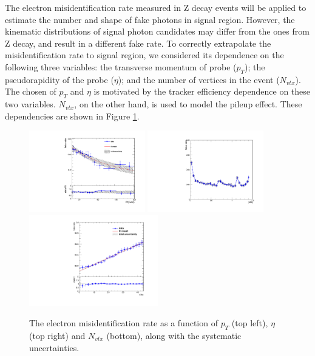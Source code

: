 \documentclass[thesis.tex]{subfiles}
\renewcommand\_{\textunderscore\allowbreak}
\begin{document}
The electron misidentification rate measured in Z decay events will be applied to estimate the number and shape of fake photons in signal region. However, the kinematic distributions of signal photon candidates may differ from the ones from Z decay, and result in a different fake rate. To correctly extrapolate the misidentification rate to signal region, we considered its dependence on the following three variables: the transverse momentum of probe ($p_T$); the pseudorapidity of the probe ($\eta$); and the number of vertices in the event ($N_{vtx}$). The chosen of $p_T$ and $\eta$ is motivated by the tracker efficiency dependence on these two variables. $N_{vtx}$, on the other hand, is used to model the pileup effect. These dependencies are shown in Figure \ref{fig:elefakepho_rate_pt}.


\begin{figure}[hbtp]
  \centering
    \includegraphics[width=0.45\textwidth]{Figures/elefake_pt_systematic_data.pdf}
    \includegraphics[width=0.45\textwidth]{Figures/elefake_eta_systematic_data.pdf}
     \includegraphics[width=0.5\textwidth]{Figures/elefake_vtx_systematic.pdf}
  \caption{The electron misidentification rate as a function of $p_T$ (top left), $\eta$ (top right) and $N_{vtx}$ (bottom), along with the systematic uncertainties.}
  \label{fig:elefakepho_rate_pt}
\end{figure}
\end{document}
